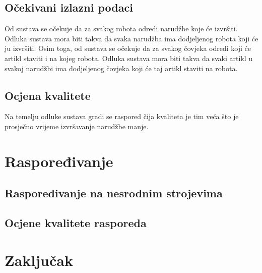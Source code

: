 \documentclass[times, utf8, seminar]{fer}
\begin{document}
\section{Očekivani izlazni podaci}
Od sustava se očekuje da za svakog robota odredi narudžbe koje će izvršiti. Odluka sustava mora biti
takva da svaka narudžba ima dodjeljenog robota koji će ju izvršiti. Osim toga, od sustava se očekuje
da za svakog čovjeka odredi koji će artikl staviti i na kojeg robota. Odluka sustava mora biti
takva da svaki artikl u svakoj narudžbi ima dodjeljenog čovjeka koji će taj artikl staviti na robota.

\section{Ocjena kvalitete}
Na temelju odluke sustava gradi se raspored čija kvaliteta  je tim
veća što je prosječno vrijeme izvršavanje narudžbe manje.

\chapter{Raspoređivanje}

\section{Raspoređivanje na nesrodnim strojevima}

\section{Ocjene kvalitete rasporeda}

\chapter{Zaključak}




\begin{sazetak}

\end{sazetak}

\begin{abstract}

\end{abstract}
\end{document}
